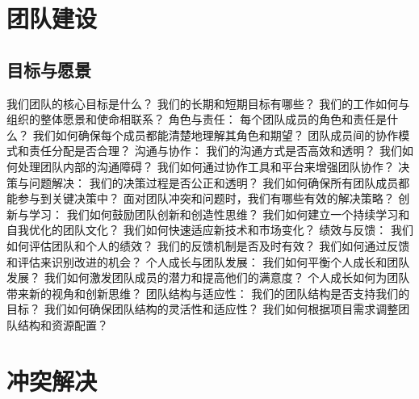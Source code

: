 \documentclass[12pt]{book}
\begin{document}
\section{团队建设}
\subsection{目标与愿景}
我们团队的核心目标是什么？
我们的长期和短期目标有哪些？
我们的工作如何与组织的整体愿景和使命相联系？
角色与责任：
每个团队成员的角色和责任是什么？
我们如何确保每个成员都能清楚地理解其角色和期望？
团队成员间的协作模式和责任分配是否合理？
沟通与协作：
我们的沟通方式是否高效和透明？
我们如何处理团队内部的沟通障碍？
我们如何通过协作工具和平台来增强团队协作？
决策与问题解决：
我们的决策过程是否公正和透明？
我们如何确保所有团队成员都能参与到关键决策中？
面对团队冲突和问题时，我们有哪些有效的解决策略？
创新与学习：
我们如何鼓励团队创新和创造性思维？
我们如何建立一个持续学习和自我优化的团队文化？
我们如何快速适应新技术和市场变化？
绩效与反馈：
我们如何评估团队和个人的绩效？
我们的反馈机制是否及时有效？
我们如何通过反馈和评估来识别改进的机会？
个人成长与团队发展：
我们如何平衡个人成长和团队发展？
我们如何激发团队成员的潜力和提高他们的满意度？
个人成长如何为团队带来新的视角和创新思维？
团队结构与适应性：
我们的团队结构是否支持我们的目标？
我们如何确保团队结构的灵活性和适应性？
我们如何根据项目需求调整团队结构和资源配置？


\section{冲突解决}
\end{document}
